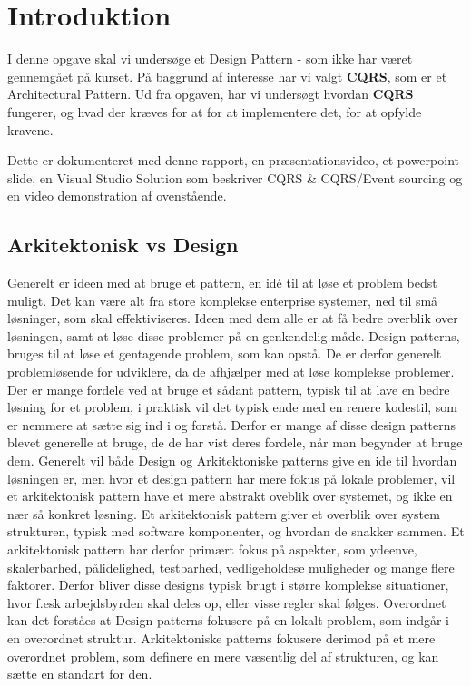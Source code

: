 \chapter{Introduktion}
I denne opgave skal vi undersøge et Design Pattern - som ikke har været gennemgået på kurset. 
På baggrund af interesse har vi valgt \textbf{CQRS}, som er et Architectural Pattern. Ud fra opgaven, har vi undersøgt hvordan \textbf{CQRS} fungerer, og hvad der kræves for at for at implementere det, for at opfylde kravene. 

Dette er dokumenteret med denne rapport, en præsentationsvideo, et powerpoint slide, en Visual Studio Solution som beskriver CQRS \& CQRS/Event sourcing og en video demonstration af ovenstående.

\section{Arkitektonisk vs Design}
Generelt er ideen med at bruge et pattern, en idé til at løse et problem bedst muligt. Det kan være alt fra store komplekse enterprise systemer, ned til små løsninger, som skal effektiviseres. Ideen med dem alle er at få bedre overblik over løsningen, samt at løse disse problemer på en genkendelig måde.
\newline
\newline
Design patterns, bruges til at løse et gentagende problem, som kan opstå. De er derfor generelt problemløsende for udviklere, da de afhjælper med at løse komplekse problemer.
Der er mange fordele ved at bruge et sådant pattern, typisk til at lave en bedre løsning for et problem, i praktisk vil det typisk ende med en renere kodestil, som er nemmere at sætte sig ind i og forstå. Derfor er mange af disse design patterns blevet generelle at bruge, de de har vist deres fordele, når man begynder at bruge dem.
\newline
\newline
Generelt vil både Design og Arkitektoniske patterns give en ide til hvordan løsningen er, men hvor et design pattern har mere fokus på lokale problemer, vil et arkitektonisk pattern have et mere abstrakt oveblik over systemet, og ikke en nær så konkret løsning.
Et arkitektonisk pattern giver et overblik over system strukturen, typisk med software komponenter, og hvordan de snakker sammen. Et arkitektonisk pattern har derfor primært fokus på aspekter, som ydeenve, skalerbarhed, pålidelighed, testbarhed, vedligeholdese muligheder og mange flere faktorer. Derfor bliver disse designs typisk brugt i større komplekse situationer, hvor f.esk arbejdsbyrden skal deles op, eller visse regler skal følges.
\newline
\newline
Overordnet kan det forståes at Design patterns fokusere på en lokalt problem, som indgår i en overordnet struktur. Arkitektoniske patterns fokusere derimod på et mere overordnet problem, som definere en mere væsentlig del af strukturen, og kan sætte en standart for den.

